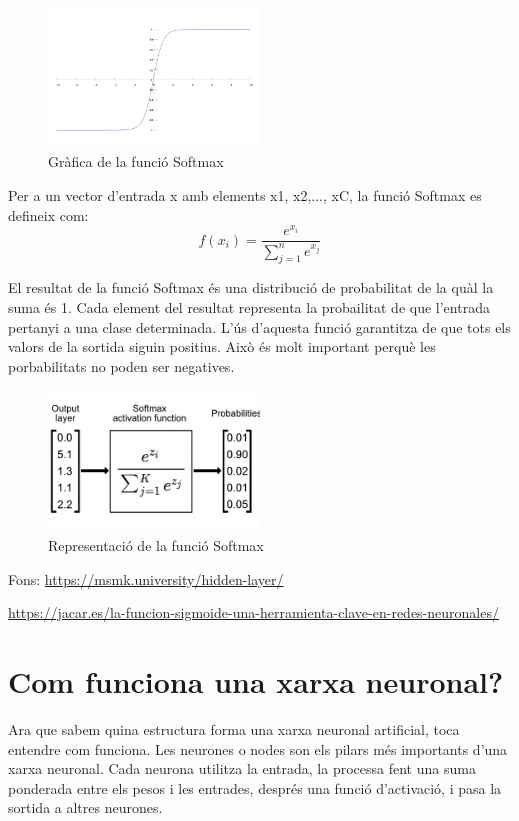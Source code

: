\begin{figure}[h!]
    \centering
    \includegraphics[width=0.5\textwidth]{./figures/Softmax.png}
    \caption{Gràfica de la funció Softmax}
\end{figure}

Per a un vector d'entrada x amb elements x1, x2,..., xC, la funció Softmax es defineix com:
\[f(x_i) = \frac{e^{x_i}}{\sum_{j=1}^{n} e^{x_j}}\]

El resultat de la funció Softmax és una distribució de probabilitat de la quàl la suma és 1. Cada element del resultat representa la probailitat de que l'entrada pertanyi a una clase determinada. L'ús d'aquesta funció garantitza de que tots els valors de la sortida siguin positius. Això és molt important perquè les porbabilitats no poden ser negatives.

\begin{figure}[H]
    \centering
    \includegraphics[width=0.5\textwidth]{./figures/representacio_Softmax.png}
    \caption{Representació de la funció Softmax}
\end{figure}

Fons: \href{https://msmk.university/hidden-layer/}{https://msmk.university/hidden-layer/}


\href{https://jacar.es/la-funcion-sigmoide-una-herramienta-clave-en-redes-neuronales/}{https://jacar.es/la-funcion-sigmoide-una-herramienta-clave-en-redes-neuronales/}

\section{Com funciona una xarxa neuronal?}
Ara que sabem quina estructura forma una xarxa neuronal artificial, toca entendre com funciona. Les neurones o nodes son els pilars més importants d'una xarxa neuronal. Cada neurona utilitza la entrada, la processa fent una suma ponderada entre els pesos i les entrades, després una funció d'activació, i pasa la sortida a altres neurones.

